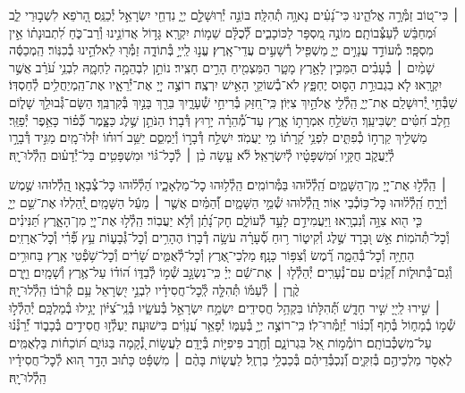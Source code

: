 \documentclass[twoside, openany, parskip=half, 11pt]{book}
\begin{document}
 ׀
כִּי־ט֭וֹב זַמְּ֯רָ֣ה אֱלֹהֵ֑ינוּ כִּי־נָ֝עִ֗ים נָאוָ֥ה תְ֯הִלָּֽה׃
בּוֹנֵ֣ה יְ֯רֽוּשָׁלַ֣‍ִם יְיָ֑ נִדְחֵ֖י יִשְׂרָאֵ֣ל יְ֯כַנֵּֽס׃
הָ֭רֹפֵא לִשְׁב֣וּרֵי לֵ֑ב וּ֝מְחַבֵּ֗שׁ לְ֯עַצְּ֯בוֹתָֽם׃
מוֹנֶ֣ה מִ֭סְפָּר לַכּוֹכָבִ֑ים לְ֯֝כֻלָּ֗ם שֵׁמ֥וֹת יִקְרָֽא׃
גָּד֣וֹל אֲדוֹנֵ֣ינוּ וְ֯רַב־כֹּ֑חַ לִ֝תְבוּנָת֗וֹ אֵ֣ין מִסְפָּֽר׃
מְ֯עוֹדֵ֣ד עֲנָוִ֣ים יְיָ֑ מַשְׁפִּ֖יל רְ֯שָׁעִ֣ים עֲדֵי־אָֽרֶץ׃
עֱנ֣וּ לַֽייָ֣ בְּ֯תוֹדָ֑ה זַמְּ֯ר֖וּ לֵאלֹהֵ֣ינוּ בְ֯כִנּֽוֹר׃
הַֽמְכַסֶּ֬ה שָׁמַ֨יִם ׀ בְּ֯עָבִ֗ים הַמֵּכִ֣ין לָאָ֣רֶץ מָטָ֑ר הַמַּצְמִ֖יחַ הָרִ֣ים חָצִֽיר׃
נוֹתֵ֣ן לִבְהֵמָ֣ה לַחְמׇ֑הּ לִבְנֵ֥י עֹ֝רֵ֗ב אֲשֶׁ֣ר יִקְרָֽאוּ׃
לֹ֤א בִגְבוּרַ֣ת הַסּ֣וּס יֶחְפָּ֑ץ לֹא־בְ֯שׁוֹקֵ֖י הָאִ֣ישׁ יִרְצֶֽה׃
רוֹצֶ֣ה יְיָ֭ אֶת־יְ֯רֵאָ֑יו אֶת־הַֽמְיַחֲלִ֥ים לְ֯חַסְדּֽוֹ׃
שַׁבְּ֯חִ֣י יְ֭֯רוּשָׁלַ‍ִם אֶת־יְיָ֑ הַֽלְ֯לִ֖י אֱלֹהַ֣יִךְ צִיּֽוֹן׃
כִּֽי־חִ֭זַּק בְּ֯רִיחֵ֣י שְׁ֯עָרָ֑יִךְ בֵּרַ֖ךְ בָּנַ֣יִךְ בְּ֯קִרְבֵּֽךְ׃
הַשָּׂם־גְּ֯בוּלֵ֥ךְ שָׁל֑וֹם חֵ֥לֶב חִ֝טִּ֗ים יַשְׂבִּיעֵֽךְ׃
הַשֹּׁלֵ֣חַ אִמְרָת֣וֹ אָ֑רֶץ עַד־מְ֯֝הֵרָ֗ה יָר֥וּץ דְּ֯בָרֽוֹ׃
הַנֹּתֵ֣ן שֶׁ֣לֶג כַּצָּ֑מֶר כְּ֯֝פ֗וֹר כָּאֵ֥פֶר יְ֯פַזֵּֽר׃
מַשְׁלִ֣יךְ קַֽרְח֣וֹ כְ֯פִתִּ֑ים לִפְנֵ֥י קָ֝רָת֗וֹ מִ֣י יַעֲמֹֽד׃
יִשְׁלַ֣ח דְּ֯בָר֣וֹ וְ֯יַמְסֵ֑ם יַשֵּׁ֥ב ר֝וּח֗וֹ יִזְּ֯לוּ־מָֽיִם׃
מַגִּ֣יד דְּ֯בָרָ֣ו לְ֯יַעֲקֹ֑ב חֻקָּ֥יו וּ֝מִשְׁפָּטָ֗יו לְ֯יִשְׂרָאֵֽל׃
לֹ֘א עָ֤שָׂה כֵ֨ן ׀ לְ֯כׇל־גּ֗וֹי וּמִשְׁפָּטִ֥ים בַּל־יְ֯דָע֗וּם הַֽלְ֯לוּ־יׇֽהּ׃


 ׀
הַֽלְ֯ל֣וּ אֶת־יְיָ֭ מִן־הַשָּׁמַ֑יִם הַֽ֝לְ֯ל֗וּהוּ בַּמְּ֯רוֹמִֽים׃
הַֽלְ֯ל֥וּהוּ כׇל־מַלְאָכָ֑יו הַ֝לְ֯ל֗וּהוּ כׇּל־צְ֯בָאָֽו׃
הַֽ֭לְ֯לוּהוּ שֶׁ֣מֶשׁ וְ֯יָרֵ֑חַ הַֽ֝לְ֯ל֗וּהוּ כׇּל־כּ֥וֹכְ֯בֵי אֽוֹר׃
הַֽ֭לְ֯לוּהוּ שְׁ֯מֵ֣י הַשָּׁמָ֑יִם וְ֯֝הַמַּ֗יִם אֲשֶׁ֤ר ׀ מֵעַ֬ל הַשָּׁמָֽיִם׃
יְֽ֭֯הַלְלוּ אֶת־שֵׁ֣ם יְיָ֑ כִּ֤י ה֖וּא צִוָּ֣ה וְ֯נִבְרָֽאוּ׃
וַיַּעֲמִידֵ֣ם לָעַ֣ד לְ֯עוֹלָ֑ם חׇק־נָ֝תַ֗ן וְ֯לֹ֣א יַעֲבֽוֹר׃
הַֽלְ֯ל֣וּ אֶת־יְיָ֭ מִן־הָאָ֑רֶץ תַּ֝נִּינִ֗ים וְ֯כׇל־תְּ֯הֹמֽוֹת׃
אֵ֣שׁ וּ֭בָרָד שֶׁ֣לֶג וְ֯קִיט֑וֹר ר֥וּחַ סְ֯֝עָרָ֗ה עֹשָׂ֥ה דְ֯בָרֽוֹ׃
הֶהָרִ֥ים וְ֯כׇל־גְּ֯בָע֑וֹת עֵ֥ץ פְּ֯֝רִ֗י וְ֯כׇל־אֲרָזִֽים׃
הַחַיָּ֥ה וְ֯כׇל־בְּ֯הֵמָ֑ה רֶ֗֝מֶשׂ וְ֯צִפּ֥וֹר כָּנָֽף׃
מַלְכֵי־אֶ֭רֶץ וְ֯כׇל־לְ֯אֻמִּ֑ים שָׂ֝רִ֗ים וְ֯כׇל־שֹׁ֥פְ֯טֵי אָֽרֶץ׃
בַּחוּרִ֥ים וְ֯גַם־בְּ֯תוּל֑וֹת זְ֯֝קֵנִ֗ים עִם־נְ֯עָרִֽים׃
יְ֯הַלְ֯ל֤וּ ׀ אֶת־שֵׁ֬ם יְיָ֗ כִּֽי־נִשְׂגָּ֣ב שְׁ֯מ֣וֹ לְ֯בַדּ֑וֹ
ה֝וֹד֗וֹ עַל־אֶ֥רֶץ וְ֯שָׁמָֽיִם׃ וַיָּ֤רֶם קֶ֨רֶן ׀ לְ֯עַמּ֡וֹ תְּ֯הִלָּ֤ה לְֽ֯כׇל־חֲסִידָ֗יו
לִבְנֵ֣י יִ֭שְׂרָאֵל עַ֥ם קְ֯רֹב֗וֹ הַֽלְ֯לוּ־יׇֽהּ׃\\
 ׀
שִׁ֣ירוּ לַֽייָ֭ שִׁ֣יר חָדָ֑שׁ תְּ֯֝הִלָּת֗וֹ בִּקְהַ֥ל חֲסִידִֽים׃
יִשְׂמַ֣ח יִשְׂרָאֵ֣ל בְּ֯עֹשָׂ֑יו בְּ֯נֵֽי־צִ֝יּ֗וֹן יָגִ֥ילוּ בְ֯מַלְכָּֽם׃
יְ֯הַלְ֯ל֣וּ שְׁ֯מ֣וֹ בְ֯מָח֑וֹל בְּ֯תֹ֥ף וְ֯֝כִנּ֗וֹר יְ֯זַמְּ֯רוּ־לֽוֹ׃
כִּֽי־רוֹצֶ֣ה יְיָ֣ בְּ֯עַמּ֑וֹ יְ֯פָאֵ֥ר עֲ֝נָוִ֗ים בִּישׁוּעָֽה׃
יַעְלְ֯ז֣וּ חֲסִידִ֣ים בְּ֯כָב֑וֹד יְ֯֝רַנְּ֯נ֗וּ עַל־מִשְׁכְּ֯בוֹתָֽם׃
רוֹמְ֯מ֣וֹת אֵ֭ל בִּגְרוֹנָ֑ם וְ֯חֶ֖רֶב פִּיפִיּ֣וֹת בְּ֯יָדָֽם׃
לַעֲשׂ֣וֹת נְ֭֯קָמָה בַּגּוֹיִ֑ם תּ֝וֹכֵח֗וֹת בַּלְאֻמִּֽים׃
לֶאְסֹ֣ר מַלְכֵיהֶ֣ם בְּ֯זִקִּ֑ים וְ֯֝נִכְבְּ֯דֵיהֶ֗ם בְּ֯כַבְלֵ֥י בַרְזֶֽל׃
לַעֲשׂ֤וֹת בָּהֶ֨ם ׀ מִשְׁפָּ֬ט כָּת֗וּב הָדָ֣ר ה֭וּא לְ֯כׇל־חֲסִידָ֗יו הַֽלְ֯לוּ־יׇֽהּ׃
\end{document}
